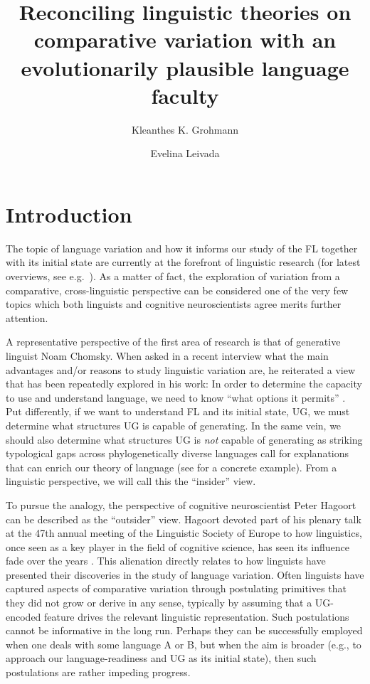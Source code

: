 \documentclass[output=paper]{langsci/langscibook}
\author{Kleanthes K. Grohmann\affiliation{University of Cyprus, Cyprus
Acquisition Team}\and Evelina Leivada\affiliation{UiT The Arctic University of
Norway, Cyprus Acquisition Team}}
\title{Reconciling linguistic theories on comparative variation with an evolutionarily plausible language
faculty}
\begin{document}
\glsresetall


\section{Introduction}

The topic of language variation and how it informs our study of the \gls{FL}
together with its initial state are currently at the forefront of linguistic
research (for latest overviews, see e.g.\
\citealt{Hinzen2014,Trettenbrein2015,BerwickChomsky2016}). As a matter of fact,
the exploration of variation from a comparative, cross-linguistic perspective
can be considered one of the very few topics which both linguists and cognitive
neuroscientists agree merits further attention.

A representative perspective of the first area of research is that of
generative linguist Noam Chomsky. When asked in a recent interview what the
main advantages and/or reasons to study linguistic variation are, he reiterated
a view that has been repeatedly explored in his work: In order to determine the
capacity to use and understand language, we need to know \enquote{what options
it permits} \citep{Chomsky2015b}. Put differently, if we want to understand
\gls{FL} and its initial state, \gls{UG}, we must determine what structures
\gls{UG} is capable of generating. In the same vein, we should also determine
what structures \gls{UG}\is{Universal Grammar} is \emph{not} capable of generating as striking
typological gaps across phylogenetically diverse languages call for
explanations that can enrich our theory of language (see
\citealt{BibHolRob2014} for a concrete example). From a linguistic perspective,
we will call this the \enquote{insider} view.

To pursue the analogy, the perspective of cognitive neuroscientist Peter
Hagoort can be described as the \enquote{outsider} view. Hagoort devoted part
of his plenary talk at the 47th annual meeting of the Linguistic Society of
Europe to how linguistics, once seen as a key player in the field of cognitive
science, has seen its influence fade over the years \citep{Hagoort2014}. This
alienation directly relates to how linguists have presented their discoveries
in the study of language variation. Often linguists have captured aspects of
comparative variation through postulating primitives that they did not grow or
derive in any sense, typically by assuming that a \gls{UG}-encoded feature
drives the relevant linguistic representation. Such postulations cannot be
informative in the long run. Perhaps they can be successfully employed when one
deals with some language A or B, but when the aim is broader (e.g., to approach
our language-readiness and \gls{UG}\is{Universal Grammar} as its initial
state), then such postulations are rather impeding progress.
\end{document}
